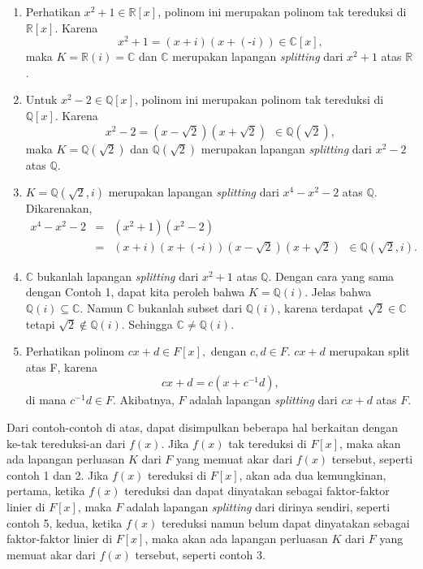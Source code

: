 	\begin{enumerate}
	\item Perhatikan $x^2+1 \in \mathbb{R}[x]$, polinom ini merupakan polinom tak tereduksi di $\mathbb{R}[x]$. Karena $$x^2+1=(x+\textit{i})(x+(\textit{-i})) \in \mathbb{C}[x],$$ maka $K=\mathbb{R}(\textit{i}) = \mathbb{C}$ dan $\mathbb{C}$ merupakan 			lapangan \textit{splitting} dari $x^2+1$ atas $\mathbb{R}$.
	\item Untuk $x^2-2 \in \mathbb{Q}[x]$, polinom ini merupakan polinom tak tereduksi di $\mathbb{Q}[x]$. Karena $$x^2-2 =(x-\sqrt{2})(x+\sqrt{2})~~\in \mathbb{Q}(\sqrt{2}),$$ maka $K=\mathbb{Q}(\sqrt{2})$ dan $\mathbb{Q}(\sqrt{2})$ merupakan 					lapangan \textit{splitting} dari $x^2-2$ atas $\mathbb{Q}$.
	\item 	$K=\mathbb{Q}(\sqrt{2},\textit{i})$ merupakan lapangan \textit{splitting} dari $x^4-x^2-2$ atas $\mathbb{Q}$. Dikarenakan,
	$$\begin{array}{rcl}
	x^4-x^2-2 &=& (x^2+1)(x^2-2)\\
	&=& (x+\textit{i})(x+(\textit{-i}))(x-\sqrt{2})(x+\sqrt{2})~~\in \mathbb{Q}(\sqrt{2},\textit{i}).
	\end{array}$$
	\item $\mathbb{C}$ bukanlah lapangan \textit{splitting} dari $x^2+1$ atas $\mathbb{Q}$. Dengan cara yang sama dengan Contoh 1, dapat kita peroleh bahwa $K=\mathbb{Q}(\textit{i})$. Jelas bahwa $\mathbb{Q}(\textit{i}) \subseteq \mathbb{C}$. Namun $\mathbb{C}$ 	bukanlah subset dari $\mathbb{Q}(\textit{i})$, karena terdapat $\sqrt{2} \in \mathbb{C}$ tetapi $\sqrt{2} \notin \mathbb{Q}(\textit{i}).$ Sehingga $\mathbb{C} \ne \mathbb{Q}(\textit{i}).$
	\item Perhatikan polinom $cx+d \in F[x],$ dengan $c,d\in F.$  $cx+d$ merupakan split atas F, karena $$cx+d=c(x+c^{-1}d),$$ di mana $c^{-1}d \in F$. Akibatnya, $F$ adalah lapangan \textit{splitting} dari $cx+d$ atas $F$.
	\end{enumerate}
\par Dari contoh-contoh di atas, dapat disimpulkan beberapa hal berkaitan dengan ke-tak tereduksi-an dari $f(x)$. Jika $f(x)$ tak tereduksi  di $F[x]$, maka akan ada lapangan perluasan $K$ dari $F$ yang memuat akar dari $f(x)$ tersebut, seperti contoh 1 dan 2. Jika $f(x)$ 		tereduksi di $F[x]$, akan ada dua kemungkinan, pertama, ketika $f(x)$ tereduksi dan dapat dinyatakan sebagai faktor-faktor linier di $F[x]$, maka $F$ adalah lapangan \textit{splitting} dari dirinya sendiri, seperti contoh 5, kedua, ketika $f(x)$ tereduksi namun belum 		dapat dinyatakan sebagai faktor-faktor linier di $F[x]$, maka akan ada lapangan perluasan $K$ dari $F$ yang memuat akar dari $f(x)$ tersebut, seperti contoh 3.
